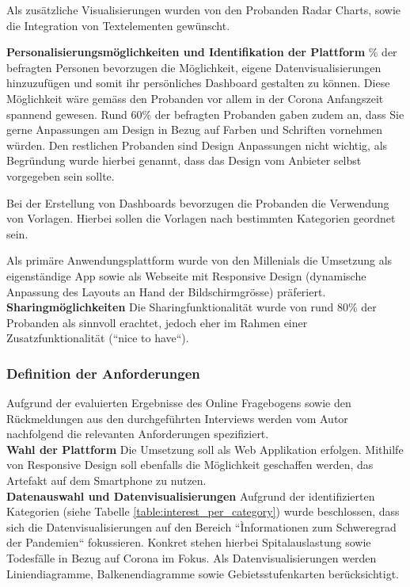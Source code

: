 Als zusätzliche Visualisierungen wurden von den Probanden Radar Charts, sowie die Integration von Textelementen gewünscht.

\clearpage
\noindent
\textbf{Personalisierungsmöglichkeiten und Identifikation der Plattform}
\newline
{}\% der befragten Personen bevorzugen die Möglichkeit, eigene Datenvisualisierungen hinzuzufügen und somit ihr persönliches Dashboard gestalten zu können. Diese Möglichkeit wäre gemäss den Probanden vor allem in der Corona Anfangszeit spannend gewesen. Rund 60\% der befragten Probanden gaben zudem an, dass Sie gerne Anpassungen am Design in Bezug auf Farben und Schriften vornehmen würden. Den restlichen Probanden sind Design Anpassungen nicht wichtig, als Begründung wurde hierbei genannt, dass das Design vom Anbieter selbst vorgegeben sein sollte.

Bei der Erstellung von Dashboards bevorzugen die Probanden die Verwendung von Vorlagen. Hierbei sollen die Vorlagen nach bestimmten Kategorien geordnet sein.

Als primäre Anwendungsplattform wurde von den Millenials die Umsetzung als eigenständige App sowie als Webseite mit Responsive Design (dynamische Anpassung des Layouts an Hand der Bildschirmgrösse) präferiert.\\

\noindent
\textbf{Sharingmöglichkeiten}
\newline
\indent
Die Sharingfunktionalität wurde von rund 80\% der Probanden als sinnvoll erachtet, jedoch eher im Rahmen einer Zusatzfunktionalität (``nice to have``).


\subsubsection{Definition der Anforderungen} \label{ch:definition_of_objectives}
Aufgrund der evaluierten Ergebnisse des Online Fragebogens sowie den Rückmeldungen aus den durchgeführten Interviews werden vom Autor nachfolgend die relevanten Anforderungen spezifiziert.\\

\noindent
\textbf{Wahl der Plattform}
\newline
\indent
Die Umsetzung soll als Web Applikation erfolgen. Mithilfe von Responsive Design soll ebenfalls die Möglichkeit geschaffen werden, das Artefakt auf dem Smartphone zu nutzen.\\

\noindent
\textbf{Datenauswahl und Datenvisualisierungen}
\newline
\indent
Aufgrund der identifizierten Kategorien (siehe Tabelle \ref{table:interest_per_category}) wurde beschlossen, dass sich die Datenvisualisierungen auf den Bereich ``Ìnformationen zum Schweregrad der Pandemien`` fokussieren. Konkret stehen hierbei Spitalauslastung sowie Todesfälle in Bezug auf Corona im Fokus. Als Datenvisualisierungen werden Liniendiagramme, Balkenendiagramme sowie Gebietsstufenkarten berücksichtigt.\\

